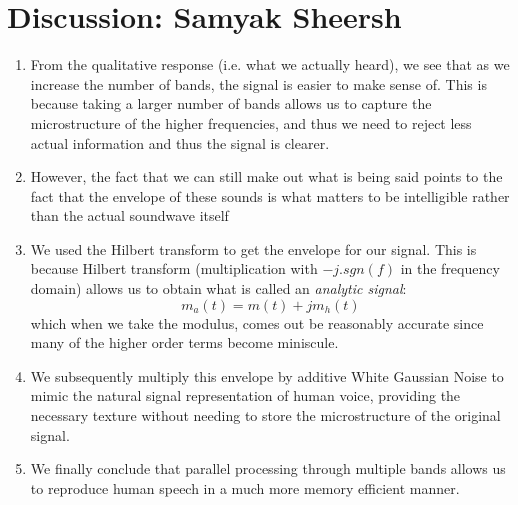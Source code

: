 \documentclass{article}
\begin{document}
\section{Discussion: Samyak Sheersh}
\begin{enumerate}
  \item From the qualitative response (i.e. what we actually heard), we see that as we increase the number of bands, the signal is easier to make sense of. This is because taking a larger number of bands allows us to capture the microstructure of the higher frequencies, and thus we need to reject less actual information and thus the signal is clearer.

  \item However, the fact that we can still make out what is being said points to the fact that the envelope of these sounds is what matters to be intelligible rather than the actual soundwave itself
  \item We used the Hilbert transform to get the envelope for our signal. This is because Hilbert transform (multiplication with $-j.sgn(f)$ in the frequency domain) allows us to obtain what is called an \emph{analytic signal}:
    \begin{equation}
        m_a(t)=m(t) + j m_h(t)
    \end{equation}
    which when we take the modulus, comes out be reasonably accurate since many of the higher order terms become miniscule.
  \item We subsequently multiply this envelope by additive White Gaussian Noise to mimic the natural signal representation of human voice, providing the necessary texture without needing to store the microstructure of the original signal. 
  \item We finally conclude that parallel processing through multiple bands allows us to reproduce human speech in a much more memory efficient manner. 
\end{enumerate}
\end{document}
